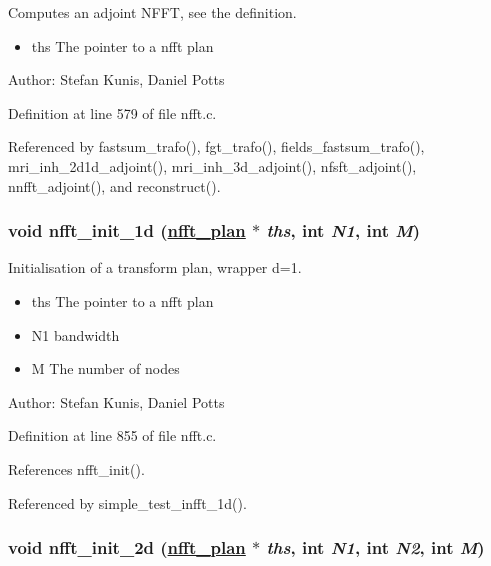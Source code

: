Computes an adjoint NFFT, see the definition. 

\begin{itemize}
\item ths The pointer to a nfft plan\end{itemize}
\begin{Desc}
\item[Author:]Stefan Kunis, Daniel Potts \end{Desc}


Definition at line 579 of file nfft.c.

Referenced by fastsum\_\-trafo(), fgt\_\-trafo(), fields\_\-fastsum\_\-trafo(), mri\_\-inh\_\-2d1d\_\-adjoint(), mri\_\-inh\_\-3d\_\-adjoint(), nfsft\_\-adjoint(), nnfft\_\-adjoint(), and reconstruct().\hypertarget{group__nfft_ga4}{
\subsubsection[nfft\_\-init\_\-1d]{\setlength{\rightskip}{0pt plus 5cm}void nfft\_\-init\_\-1d (\hyperlink{structnfft__plan}{nfft\_\-plan} $\ast$ {\em ths}, int {\em N1}, int {\em M})}}
\label{group__nfft_ga4}


Initialisation of a transform plan, wrapper d=1. 

\begin{itemize}
\item ths The pointer to a nfft plan \item N1 bandwidth \item M The number of nodes\end{itemize}
\begin{Desc}
\item[Author:]Stefan Kunis, Daniel Potts \end{Desc}


Definition at line 855 of file nfft.c.

References nfft\_\-init().

Referenced by simple\_\-test\_\-infft\_\-1d().\hypertarget{group__nfft_ga5}{
\subsubsection[nfft\_\-init\_\-2d]{\setlength{\rightskip}{0pt plus 5cm}void nfft\_\-init\_\-2d (\hyperlink{structnfft__plan}{nfft\_\-plan} $\ast$ {\em ths}, int {\em N1}, int {\em N2}, int {\em M})}}
\label{group__nfft_ga5}



